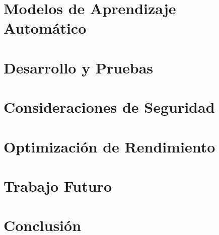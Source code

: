 \documentclass[a4paper,12pt]{article}
\begin{document}
\section{Modelos de Aprendizaje Automático}


\section{Desarrollo y Pruebas}


\section{Consideraciones de Seguridad}


\section{Optimización de Rendimiento}


\section{Trabajo Futuro}


\section{Conclusión}




\end{document}

